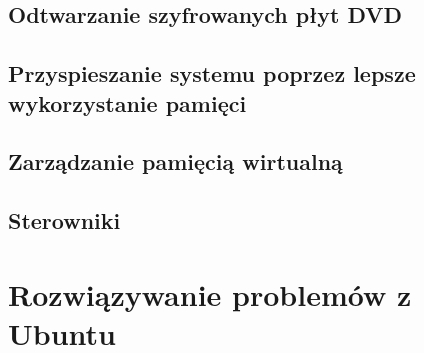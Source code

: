 \documentclass[a4paper,11pt,oneside,draft]{mwart}
\begin{document}
		\subsection{Odtwarzanie szyfrowanych płyt DVD}
			
		\subsection{Przyspieszanie systemu poprzez lepsze wykorzystanie pamięci}
		\subsection{Zarządzanie pamięcią wirtualną}
		\subsection{Sterowniki} 
	\section{Rozwiązywanie problemów z Ubuntu}
\end{document}
